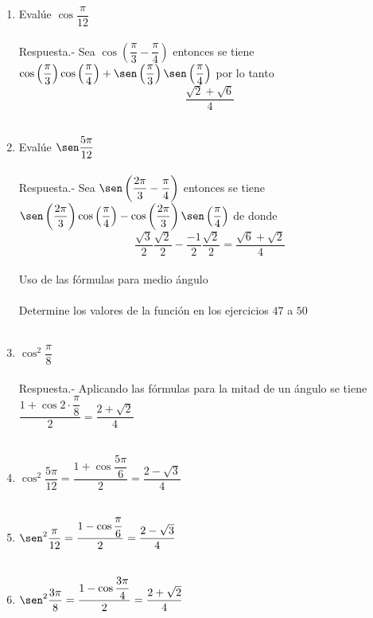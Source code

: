 \begin{enumerate}
\item Evalúe $\cos \dfrac{\pi}{12}$\\\\
    Respuesta.-\; Sea $\cos \left(\dfrac{\pi}{3}-\dfrac{\pi}{4}\right)$ entonces se tiene \; $\cos\left(\dfrac{\pi}{3}\right) \cos\left(\dfrac{\pi}{4}\right) + \sen\left(\dfrac{\pi}{3}\right) \sen\left(\dfrac{\pi}{4}\right)$ por lo tanto $$\dfrac{\sqrt{2}+\sqrt{6}}{4}$$\\

\item Evalúe $\sen \dfrac{5\pi}{12}$\\\\
    Respuesta.-\; Sea $\sen \left( \dfrac{2\pi}{3} - \dfrac{\pi}{4}\right)$ entonces se tiene \; $\sen\left( \dfrac{2\pi}{3}\right) \cos\left(\dfrac{\pi}{4}\right) - \cos\left( \dfrac{2\pi}{3} \right) \sen\left(\dfrac{\pi}{4}\right)$ de donde $$\dfrac{\sqrt{3}}{2} \dfrac{\sqrt{2}}{2} - \dfrac{-1}{2}\dfrac{\sqrt{2}}{2} = \dfrac{\sqrt{6}+\sqrt{2}}{4}$$\\

Uso de las fórmulas para medio ángulo\\\\

Determine los valores de la función en los ejercicios $47$ a $50$\\\\

\item $\cos^2 \dfrac{\pi}{8}$\\\\
    Respuesta.-\; Aplicando las fórmulas para la mitad de un ángulo se tiene $\dfrac{1+\cos 2 \cdot \dfrac{\pi}{8}}{2} = \dfrac{2+\sqrt{2}}{4}$\\\\

\item $\cos^2 \dfrac{5\pi}{12} = \dfrac{1 + \cos \dfrac{5\pi}{6}}{2} = \dfrac{2-\sqrt{3}}{4}$\\\\

\item $\sen^2 \dfrac{\pi}{12} = \dfrac{1 - \cos \dfrac{\pi}{6}}{2} = \dfrac{2-\sqrt{3}}{4}$\\\\

\item $\sen^2 \dfrac{3\pi}{8} = \dfrac{1-\cos \dfrac{3\pi}{4}}{2} = \dfrac{2 + \sqrt{2}}{4}$\\\\


\end{enumerate}
